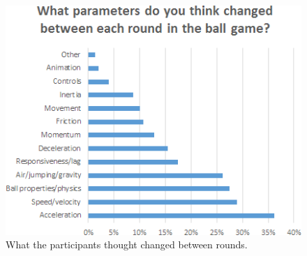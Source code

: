 \begin{figure}[htbp]
\centering
\includegraphics[width=0.9\columnwidth]{Pics/whatChanged}
\caption{What the participants thought changed between rounds.}
\label{fig:whatChanged}
\end{figure}



